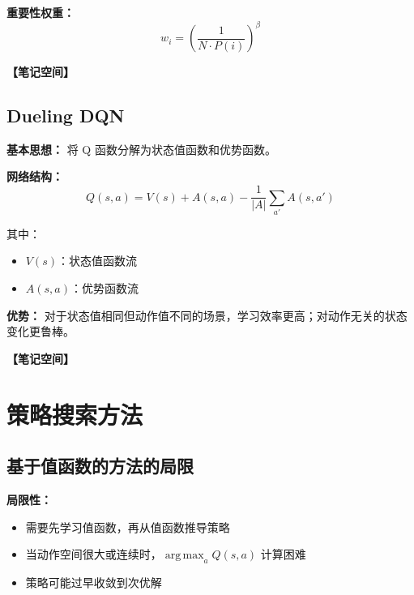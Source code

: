 \documentclass[12pt,a4paper]{article}
\newcommand{\notespace}[1][3cm]{%
  \vspace{#1}%
  \noindent\textbf{【笔记空间】}%
  \vspace{#1}%
}
\newcommand{\1}{\mathbf{1}}
\newcommand{\argmax}{\operatorname*{arg\,max}}
\begin{document}
\textbf{重要性权重：}
\begin{equation}
w_i=\left(\frac{1}{N\cdot P(i)}\right)^\beta
\end{equation}

\notespace[2cm]

\subsection{Dueling DQN}

\textbf{基本思想：} 将 Q 函数分解为状态值函数和优势函数。

\textbf{网络结构：}
\begin{equation}
Q(s,a)=V(s)+A(s,a)-\frac{1}{|A|}\sum_{a'}A(s,a')
\end{equation}

其中：
\begin{itemize}[leftmargin=2em]
  \item $V(s)$：状态值函数流
  \item $A(s,a)$：优势函数流
\end{itemize}

\begin{keybox}
\textbf{优势：} 对于状态值相同但动作值不同的场景，学习效率更高；对动作无关的状态变化更鲁棒。
\end{keybox}

\notespace[3cm]

\newpage

\section{策略搜索方法}

\subsection{基于值函数的方法的局限}

\begin{keybox}
\textbf{局限性：}
\begin{itemize}[leftmargin=1.5em]
  \item 需要先学习值函数，再从值函数推导策略
  \item 当动作空间很大或连续时，$\argmax_a Q(s,a)$ 计算困难
  \item 策略可能过早收敛到次优解
\end{itemize}
\end{keybox}
\end{document}
